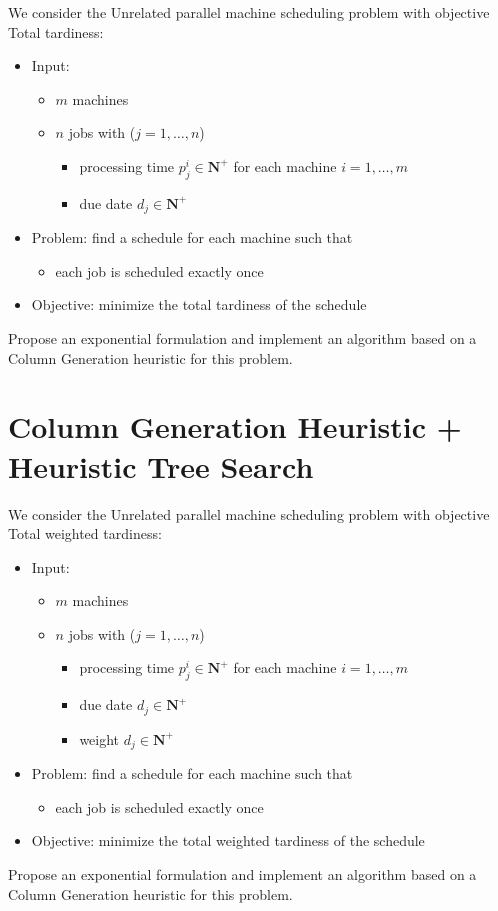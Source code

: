 \documentclass[a4paper]{article}
\newcommand{\N}{\mathbf{N}}
\begin{document}
We consider the Unrelated parallel machine scheduling problem with objective Total tardiness:
\begin{itemize}
  \item Input:
    \begin{itemize}
      \item $m$ machines
      \item $n$ jobs with ($j = 1, \dots, n$)
        \begin{itemize}
          \item processing time $p_j^i \in \N^+$ for each machine $i = 1, \dots, m$
          \item due date $d_j \in \N^+$
        \end{itemize}
    \end{itemize}
  \item Problem: find a schedule for each machine such that
    \begin{itemize}
      \item each job is scheduled exactly once
    \end{itemize}
  \item Objective: minimize the total tardiness of the schedule
\end{itemize}

Propose an exponential formulation and implement an algorithm based on a Column Generation heuristic for this problem.

\section{Column Generation Heuristic + Heuristic Tree Search}

We consider the Unrelated parallel machine scheduling problem with objective Total weighted tardiness:
\begin{itemize}
  \item Input:
    \begin{itemize}
      \item $m$ machines
      \item $n$ jobs with ($j = 1, \dots, n$)
        \begin{itemize}
          \item processing time $p_j^i \in \N^+$ for each machine $i = 1, \dots, m$
          \item due date $d_j \in \N^+$
          \item weight $d_j \in \N^+$
        \end{itemize}
    \end{itemize}
  \item Problem: find a schedule for each machine such that
    \begin{itemize}
      \item each job is scheduled exactly once
    \end{itemize}
  \item Objective: minimize the total weighted tardiness of the schedule
\end{itemize}

Propose an exponential formulation and implement an algorithm based on a Column Generation heuristic for this problem.
\end{document}
